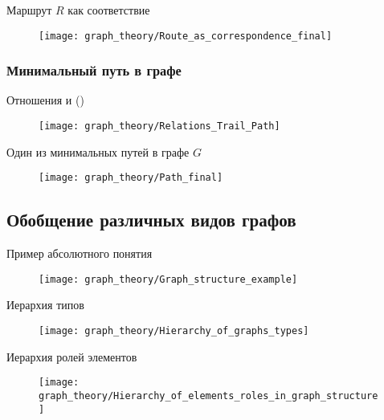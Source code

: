 \begin{frame}{Маршрут $R$ как соответствие}
  \begin{figure}
    \centering
    \texttt{[image: graph\_theory/Route\_as\_correspondence\_final]}
  \end{figure}
\end{frame}

\subsubsection{Минимальный путь в графе}

\begin{frame}{Отношения  и  ()}
  \begin{figure}
    \centering
    \texttt{[image: graph\_theory/Relations\_Trail\_Path]}
  \end{figure}
\end{frame}

\begin{frame}{Один из минимальных путей в графе $G$}
  \begin{figure}
    \centering
    \texttt{[image: graph\_theory/Path\_final]}
  \end{figure}
\end{frame}

\subsection{Обобщение различных видов графов}

\begin{frame}{Пример абсолютного понятия }
  \begin{figure}
    \centering
    \texttt{[image: graph\_theory/Graph\_structure\_example]}
  \end{figure}
\end{frame}

\begin{frame}{Иерархия типов }
  \begin{figure}
    \centering
    \texttt{[image: graph\_theory/Hierarchy\_of\_graphs\_types]}
  \end{figure}
\end{frame}

\begin{frame}{Иерархия ролей элементов }
  \begin{figure}
    \centering
    \texttt{[image: graph\_theory/Hierarchy\_of\_elements\_roles\_in\_graph\_structure]}
  \end{figure}
\end{frame}

